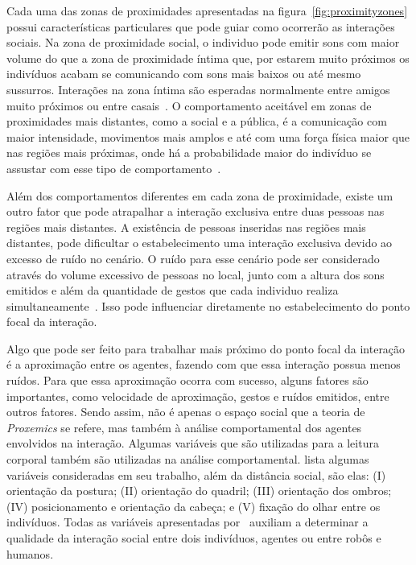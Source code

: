 Cada uma das zonas de proximidades apresentadas na figura~\ref{fig:proximityzones} possui características particulares que pode guiar como ocorrerão as interações sociais. Na zona de proximidade social, o individuo pode emitir sons com maior volume do que a zona de proximidade íntima que, por estarem muito próximos os indivíduos acabam se comunicando com sons mais baixos ou até mesmo sussurros. Interações na zona íntima são esperadas normalmente entre amigos muito próximos ou entre casais~\cite{Hall:1969, Argyle:1988}. O comportamento aceitável em zonas de proximidades mais distantes, como a social e a pública, é a comunicação com maior intensidade, movimentos mais amplos e até com uma força física maior que nas regiões mais próximas, onde há a probabilidade maior do indivíduo se assustar com esse tipo de comportamento~\cite{Henkel:2014}.

Além dos comportamentos diferentes em cada zona de proximidade, existe um outro fator que pode atrapalhar a interação exclusiva entre duas pessoas nas regiões mais distantes. A existência de pessoas inseridas nas regiões mais distantes, pode dificultar o estabelecimento uma interação exclusiva devido ao excesso de ruído no cenário. O ruído para esse cenário pode ser considerado através do volume excessivo de pessoas no local, junto com a altura dos sons emitidos e além da quantidade de gestos que cada individuo realiza simultaneamente~\cite{Walters:2009, Henkel:2014}. Isso pode influenciar diretamente no estabelecimento do ponto focal da interação.

Algo que pode ser feito para trabalhar mais próximo do ponto focal da interação é a aproximação entre os agentes, fazendo com que essa interação possua menos ruídos. Para que essa aproximação ocorra com sucesso, alguns fatores são importantes, como velocidade de aproximação, gestos e ruídos emitidos, entre outros fatores. Sendo assim, não é apenas o espaço social que a teoria de \emph{Proxemics} se refere, mas também à análise comportamental dos agentes envolvidos na interação. Algumas variáveis que são utilizadas para a leitura corporal também são utilizadas na análise comportamental.  lista algumas variáveis consideradas em seu trabalho, além da distância social, são elas: (I) orientação da postura; (II) orientação do quadril; (III) orientação dos ombros; (IV) posicionamento e orientação da cabeça; e (V) fixação do olhar entre os indivíduos. Todas as variáveis apresentadas por~ auxiliam a determinar a qualidade da interação social entre dois indivíduos, agentes ou entre robôs e humanos.

